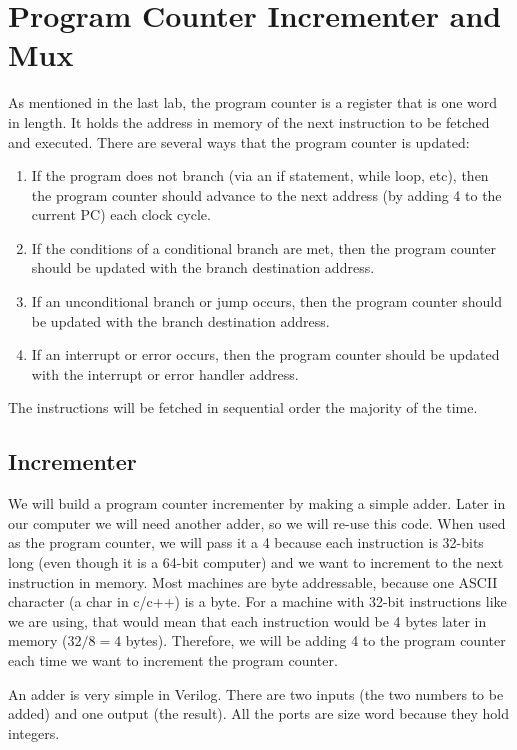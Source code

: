 \chapter{Program Counter Incrementer and Mux}

As mentioned in the last lab, the program counter is a register that is one word in length.  It holds the address in memory of the next instruction to be fetched and executed.  There are several ways that the program counter is updated:  
\begin{enumerate}
	\item If the program does not branch (via an if statement, while loop, etc), then the program counter should advance to the next address (by adding 4 to the current PC) each clock cycle.
	\item If the conditions of a conditional branch are met, then the program counter should be updated with the branch destination address.
	\item If an unconditional branch or jump occurs, then the program counter should be updated with the branch destination address.
	\item If an interrupt or error occurs, then the program counter should be updated with the interrupt or error handler address.
\end{enumerate}
The instructions will be fetched in sequential order the majority of the time.

\section{Incrementer}

We will build a program counter incrementer by making a simple adder.  Later in our computer we will need another adder, so we will re-use this code.  When used as the program counter, we will pass it a 4 because each instruction is 32-bits long (even though it is a 64-bit computer) and we want to increment to the next instruction in memory.  Most machines are byte addressable, because one ASCII character (a char in c/c++) is a byte.  For a machine with 32-bit instructions like we are using, that would mean that each instruction would be 4 bytes later in memory ($32/8=4$ bytes).  Therefore, we will be adding 4 to the program counter each time we want to increment the program counter.

An adder is very simple in Verilog.  There are two inputs (the two numbers to be added) and one output (the result).   All the ports are size word because they hold integers.  

